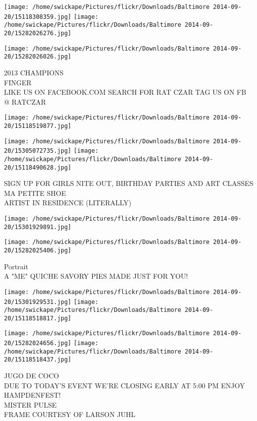 \documentclass[10pt,letterpaper]{article}
\begin{document}
\texttt{[image: /home/swickape/Pictures/flickr/Downloads/Baltimore 2014-09-20/15118308359.jpg]}
\texttt{[image: /home/swickape/Pictures/flickr/Downloads/Baltimore 2014-09-20/15282026276.jpg]}

\texttt{[image: /home/swickape/Pictures/flickr/Downloads/Baltimore 2014-09-20/15282026026.jpg]}

2013 CHAMPIONS\\
FINGER\\
LIKE US ON FACEBOOK.COM SEARCH FOR RAT CZAR TAG US ON FB @ RATCZAR
\pagebreak

\texttt{[image: /home/swickape/Pictures/flickr/Downloads/Baltimore 2014-09-20/15118519877.jpg]}

\vspace{0.25in}
\texttt{[image: /home/swickape/Pictures/flickr/Downloads/Baltimore 2014-09-20/15305072735.jpg]}
\texttt{[image: /home/swickape/Pictures/flickr/Downloads/Baltimore 2014-09-20/15118490628.jpg]}

SIGN UP FOR GIRLS NITE OUT, BIRTHDAY PARTIES AND ART CLASSES\\
MA PETITE SHOE\\
ARTIST IN RESIDENCE (LITERALLY)
\pagebreak

\texttt{[image: /home/swickape/Pictures/flickr/Downloads/Baltimore 2014-09-20/15301929891.jpg]}

\vspace{0.25in}
\texttt{[image: /home/swickape/Pictures/flickr/Downloads/Baltimore 2014-09-20/15282025406.jpg]}

Portrait\\
A "ME" QUICHE SAVORY PIES MADE JUST FOR YOU!
\pagebreak

\texttt{[image: /home/swickape/Pictures/flickr/Downloads/Baltimore 2014-09-20/15301929531.jpg]}
\texttt{[image: /home/swickape/Pictures/flickr/Downloads/Baltimore 2014-09-20/15118518817.jpg]}

\texttt{[image: /home/swickape/Pictures/flickr/Downloads/Baltimore 2014-09-20/15282024656.jpg]}
\texttt{[image: /home/swickape/Pictures/flickr/Downloads/Baltimore 2014-09-20/15118518437.jpg]}

JUGO DE COCO\\
DUE TO TODAY'S EVENT WE'RE CLOSING EARLY AT 5:00 PM ENJOY HAMPDENFEST!\\
MISTER PULSE\\
FRAME COURTESY OF LARSON JUHL
\pagebreak
\end{document}
